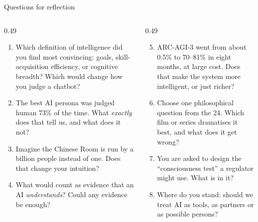 \begin{frame}{Questions for reflection}
\small
\begin{columns}[T]
\begin{column}{0.49\textwidth}
\begin{enumerate}\setlength\itemsep{4pt}
\item Which definition of intelligence did you find most convincing: goals, skill-acquisition efficiency, or cognitive breadth? Which would change how you judge a chatbot?
\item The best AI persona was judged human 73\% of the time. What \emph{exactly} does that tell us, and what does it not?
\item Imagine the Chinese Room is run by a billion people instead of one. Does that change your intuition?
\item What would count as evidence that an AI \emph{understands}? Could any evidence be enough?
\end{enumerate}
\end{column}
\begin{column}{0.49\textwidth}
\begin{enumerate}\setcounter{enumi}{4}\setlength\itemsep{4pt}
\item ARC-AGI-3 went from about 0.5\% to 70--81\% in eight months, at large cost. Does that make the system more intelligent, or just richer?
\item Choose one philosophical question from the 24. Which film or series dramatises it best, and what does it get wrong?
\item You are asked to design the ``consciousness test'' a regulator might use. What is in it?
\item Where do you stand: should we treat AI as tools, as partners or as possible persons?
\end{enumerate}
\end{column}
\end{columns}
\end{frame}


